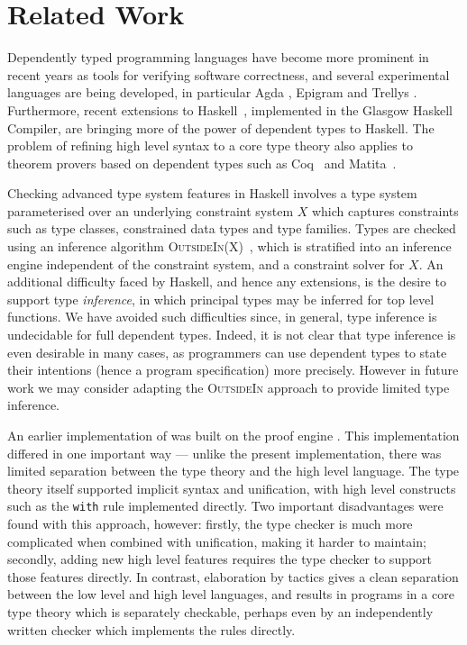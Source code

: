 \section{Related Work}

\label{sect:related}

Dependently typed programming languages have become more prominent in recent
years as tools for verifying software correctness, and several experimental
languages are being developed, in particular Agda \cite{norell2007thesis},
Epigram \cite{McBride2004a,Levitation2010} and Trellys \cite{Kimmell2012}.
Furthermore, recent extensions to Haskell~\cite{Vytiniotis2011}, implemented in the
Glasgow Haskell Compiler, are bringing more of the power of dependent types to
Haskell. The problem of refining high level syntax to a core type theory also
applies to theorem provers based on dependent types such as
Coq~\cite{Bertot2004} and Matita~\cite{Asperti2011}.

Checking advanced type system features in Haskell involves a type system
parameterised over an underlying constraint system $X$ which captures
constraints such as type classes, constrained data types and type families.
Types are checked using an inference algorithm
\textsc{OutsideIn(X)}~\cite{Vytiniotis2011}, which is stratified into an
inference engine independent of the constraint
system, and a constraint solver for $X$. An additional difficulty faced by
Haskell, and hence any extensions, is the desire to support type \emph{inference}, in
which principal types may be inferred for top level functions. We have avoided
such difficulties since, in general, type
inference is undecidable for full dependent types. Indeed, it is not clear
that type inference is even desirable in many cases, as programmers
can use dependent types to state their intentions (hence a program
specification) more precisely. However in future work we
may consider adapting the \textsc{OutsideIn} approach to provide limited type
inference.

An earlier implementation of \Idris{} was built on the \Ivor{} proof engine
\cite{Brady2006b}. This implementation differed in one important way --- unlike
the present implementation, there was limited separation between the type
theory and the high level language. The type theory itself supported implicit
syntax and unification, with high level constructs such as the \texttt{with}
rule implemented directly. Two important disadvantages were found with this
approach, however: firstly, the type checker is much more complicated when
combined with unification, making it harder to maintain; secondly, adding new
high level features requires the type checker to support those features
directly. In contrast, elaboration by tactics gives a clean separation between
the low level and high level languages, and results in programs in a core
type theory which is separately checkable, perhaps even by an independently
written checker which implements the \TT{} rules directly.

